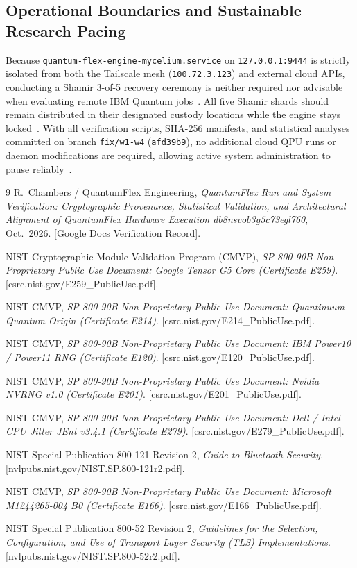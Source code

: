 \documentclass[10pt,letterpaper]{article}
\begin{document}
\subsection{Operational Boundaries and Sustainable Research Pacing}
Because \texttt{quantum-flex-engine-mycelium.service} on \texttt{127.0.0.1:9444} is strictly isolated from both the Tailscale mesh (\texttt{100.72.3.123}) and external cloud APIs, conducting a Shamir 3-of-5 recovery ceremony is neither required nor advisable when evaluating remote IBM Quantum jobs~\cite{qfx_doc}. All five Shamir shards should remain distributed in their designated custody locations while the engine stays locked~\cite{qfx_doc}. With all verification scripts, SHA-256 manifests, and statistical analyses committed on branch \texttt{fix/w1-w4} (\texttt{afd39b9}), no additional cloud QPU runs or daemon modifications are required, allowing active system administration to pause reliably~\cite{qfx_doc}.

\begin{thebibliography}{9}
R.~Chambers / QuantumFlex Engineering, \emph{QuantumFlex Run and System Verification: Cryptographic Provenance, Statistical Validation, and Architectural Alignment of QuantumFlex Hardware Execution db8nsvob3g5c73egl760}, Oct.\ 2026. [Google Docs Verification Record].

NIST Cryptographic Module Validation Program (CMVP), \emph{SP 800-90B Non-Proprietary Public Use Document: Google Tensor G5 Core (Certificate E259)}. [csrc.nist.gov/E259\_PublicUse.pdf].

NIST CMVP, \emph{SP 800-90B Non-Proprietary Public Use Document: Quantinuum Quantum Origin (Certificate E214)}. [csrc.nist.gov/E214\_PublicUse.pdf].

NIST CMVP, \emph{SP 800-90B Non-Proprietary Public Use Document: IBM Power10 / Power11 RNG (Certificate E120)}. [csrc.nist.gov/E120\_PublicUse.pdf].

NIST CMVP, \emph{SP 800-90B Non-Proprietary Public Use Document: Nvidia NVRNG v1.0 (Certificate E201)}. [csrc.nist.gov/E201\_PublicUse.pdf].

NIST CMVP, \emph{SP 800-90B Non-Proprietary Public Use Document: Dell / Intel CPU Jitter JEnt v3.4.1 (Certificate E279)}. [csrc.nist.gov/E279\_PublicUse.pdf].

NIST Special Publication 800-121 Revision 2, \emph{Guide to Bluetooth Security}. [nvlpubs.nist.gov/NIST.SP.800-121r2.pdf].

NIST CMVP, \emph{SP 800-90B Non-Proprietary Public Use Document: Microsoft M1244265-004 B0 (Certificate E166)}. [csrc.nist.gov/E166\_PublicUse.pdf].

NIST Special Publication 800-52 Revision 2, \emph{Guidelines for the Selection, Configuration, and Use of Transport Layer Security (TLS) Implementations}. [nvlpubs.nist.gov/NIST.SP.800-52r2.pdf].
\end{thebibliography}
\end{document}
